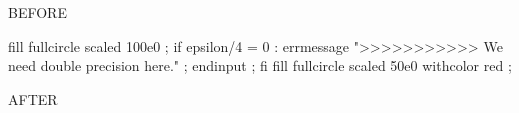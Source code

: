 

\startTEXpage[offset=10pt]

    BEFORE

        fill fullcircle scaled 100e0 ;
        if epsilon/4 = 0 :
            errmessage ">>>>>>>>>>> We need double precision here." ;
            endinput ;
        fi
        fill fullcircle scaled 50e0 withcolor red ;
    \stopuseMPgraphic



    AFTER

\stopTEXpage
